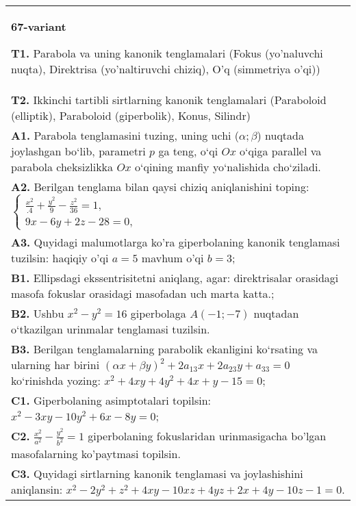 \documentclass{article}
\begin{document}
\begin{tabular}{m{17cm}}
\textbf{67-variant}
\newline

\textbf{T1.} Parabola va uning kanonik tenglamalari (Fokus (yo’naluvchi nuqta), Direktrisa (yo’naltiruvchi chiziq), O’q (simmetriya o’qi)) \\
\textbf{T2.} Ikkinchi tartibli sirtlarning kanonik tenglamalari (Paraboloid (elliptik), Paraboloid (giperbolik), Konus, Silindr) \\
\textbf{A1.} Parabola tenglamasini tuzing, uning uchi ($\alpha; \beta$) nuqtada joylashgan bo‘lib, parametri $p$ ga teng, o‘qi $Ox$ o‘qiga parallel va parabola cheksizlikka $Ox$ o‘qining manfiy yo‘nalishida cho‘ziladi. \\
\textbf{A2.} Berilgan tenglama bilan qaysi chiziq aniqlanishini toping: $\left\{\begin{array}{l}\frac{x^2}{.4}+\frac{y^2}{9}-\frac{z^2}{36}=1, \\ 9 x-6 y+2 z-28=0,\end{array}\right.$ \\
\textbf{A3.} Quyidagi malumotlarga ko'ra giperbolaning kanonik tenglamasi tuzilsin: haqiqiy o'qi $a=5$ mavhum o'qi $b=3$; \\
\textbf{B1.} Ellipsdagi ekssentrisitetni aniqlang, agar: direktrisalar orasidagi masofa fokuslar orasidagi masofadan uch marta katta.; \\
\textbf{B2.} Ushbu $x^2-y^2=16$ giperbolaga $A (-1;-7)$ nuqtadan o‘tkazilgan urinmalar tenglamasi tuzilsin. \\
\textbf{B3.} Berilgan tenglamalarning parabolik ekanligini ko‘rsating va ularning har birini $(\alpha x+\beta y)^2+2 a_{13} x+2 a_{23} y+a_{33}=0$ ko‘rinishda yozing: $x^2+4 x y+4 y^2+4 x+y-15=0 ;$ \\
\textbf{C1.} Giperbolaning asimptotalari topilsin: $x^2-3 x y-10 y^2+6 x-8 y=0$; \\
\textbf{C2.} $\frac{x^2}{a^2}-\frac{y^2}{b^2}=1$ giperbolaning fokuslaridan urinmasigacha bo'lgan masofalarning ko'paytmasi topilsin. \\
\textbf{C3.} Quyidagi sirtlarning kanonik tenglamasi va joylashishini aniqlansin: $x^2-2 y^2+z^2+4 x y-10 x z+4 y z+2 x+4 y-10 z-1=0$. \\

\end{tabular}
\vspace{1cm}
\end{document}
